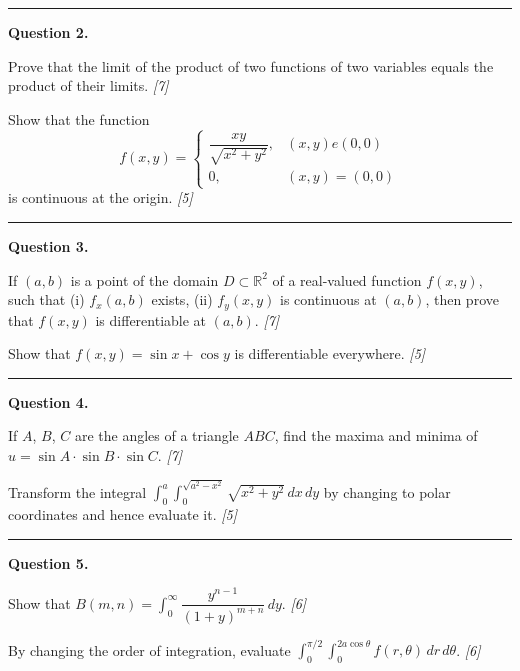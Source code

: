 \documentclass[11pt,a4paper]{article}
\newcommand{\pts}[1]{\hfill   \textit{[#1]}}
\begin{document}
\medskip\rule{\linewidth}{0.2pt}

\medskip


\noindent   \textbf{Question 2.}

\begin{parts}
  \item Prove that the limit of the product of two functions of two variables equals the product of their limits. \pts{7}
  \item Show that the function
  \[
  f(x,y) = 
\begin{cases} \dfrac{xy}{\sqrt{x^2+y^2}}, & (x,y)
e(0,0) \\ 0, & (x,y)=(0,0) \end{cases}
  \]
  is continuous at the origin. \pts{5}
\end{parts}

\medskip\rule{\linewidth}{0.2pt}

\medskip


\noindent   \textbf{Question 3.}

\begin{parts}
  \item If $(a,b)$ is a point of the domain $D\subset\mathbb{R}^2$ of a real-valued function $f(x,y)$, such that (i) $f_x(a,b)$ exists, (ii) $f_y(x,y)$ is continuous at $(a,b)$, then prove that $f(x,y)$ is differentiable at $(a,b)$. \pts{7}
  \item Show that $f(x,y) = \sin x + \cos y$ is differentiable everywhere. \pts{5}
\end{parts}

\medskip\rule{\linewidth}{0.2pt}

\medskip


\noindent   \textbf{Question 4.}

\begin{parts}
  \item If $A$, $B$, $C$ are the angles of a triangle $ABC$, find the maxima and minima of $u = \sin A \cdot \sin B \cdot \sin C$. \pts{7}
  \item Transform the integral $\displaystyle\int_0^a\!\int_0^{\sqrt{a^2-x^2}} \!\!\sqrt{x^2+y^2}\,dx\,dy$ by changing to polar coordinates and hence evaluate it. \pts{5}
\end{parts}

\medskip\rule{\linewidth}{0.2pt}

\medskip


\noindent   \textbf{Question 5.}

\begin{parts}
  \item Show that $B(m,n) = \displaystyle\int_0^\infty \dfrac{y^{n-1}}{(1+y)^{m+n}}\,dy$. \pts{6}
  \item By changing the order of integration, evaluate $\displaystyle\int_0^{\pi/2}\!\int_0^{2a\cos \theta} f(r, \theta)\,dr\,d \theta$. \pts{6}
\end{parts}
\end{document}
